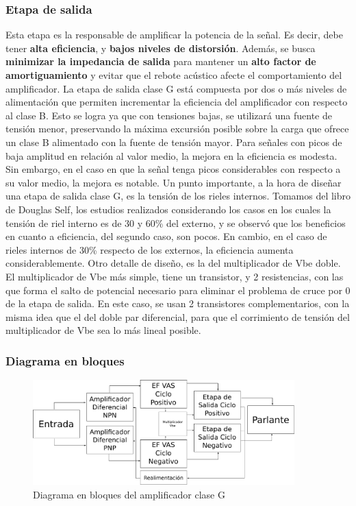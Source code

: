 \documentclass[a4paper,12pt,twoside]{article}
\begin{document}
\subsubsection{Etapa de salida}
Esta etapa es la responsable de amplificar la potencia de la señal. Es decir, debe tener \textbf{alta eficiencia}, y \textbf{bajos niveles de distorsión}. Además, se busca \textbf{minimizar la impedancia de salida} para mantener un \textbf{alto factor de amortiguamiento} y evitar que el rebote acústico afecte el comportamiento del amplificador. 
La etapa de salida clase G está compuesta por dos o más niveles de alimentación que permiten incrementar la eficiencia del amplificador con respecto al clase B. Esto se logra ya que con tensiones bajas, se utilizará una fuente de tensión menor, preservando la máxima excursión posible sobre la carga que ofrece un clase B alimentado con la fuente de tensión mayor. Para señales con picos de baja amplitud en relación al valor medio, la mejora en la eficiencia es modesta. Sin embargo, en el caso en que la señal tenga picos considerables con respecto a su valor medio, la mejora es notable. Un punto importante, a la hora de diseñar una etapa de salida clase G, es la tensión de los rieles internos. Tomamos del libro de Douglas Self, los estudios realizados considerando los casos en los cuales la tensión de riel interno es de 30 y 60\% del externo, y se observó que los beneficios en cuanto a eficiencia, del segundo caso, son pocos. En cambio, en el caso de rieles internos de 30\% respecto de los externos, la eficiencia aumenta considerablemente. Otro detalle de diseño, es la del multiplicador de Vbe doble. El multiplicador de Vbe más simple, tiene un transistor, y 2 resistencias, con las que forma el salto de potencial necesario para eliminar el problema de cruce por 0 de la etapa de salida. En este caso, se usan 2 transistores complementarios, con la misma idea que el del doble par diferencial, para que el corrimiento de tensión del multiplicador de Vbe sea lo más lineal posible.



\subsubsection{Diagrama en bloques}



\begin{figure}[H]
	\centering
	\includegraphics[width=0.9\textwidth]{img/bloques}
	\caption{Diagrama en bloques del amplificador clase G}
	\label{fig:ampli_bloques}
\end{figure}
\end{document}
